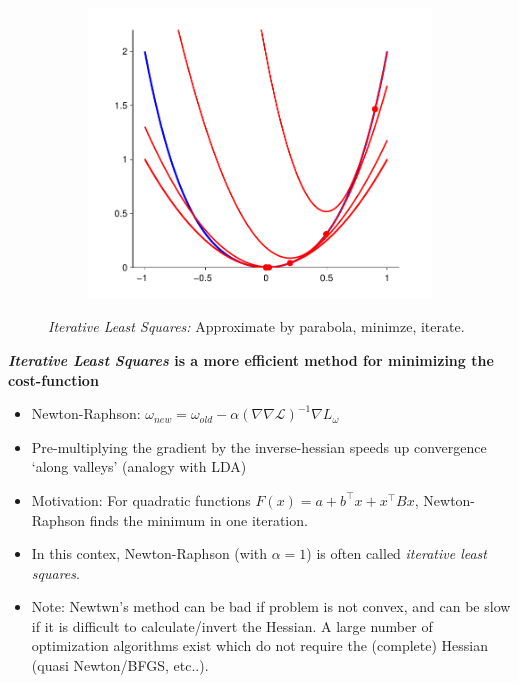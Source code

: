 \begin{figure}
\begin{subfigure}[b]{0.2\textwidth}
		\includegraphics[width=\textwidth]{./lecture7/Newton6}
	\end{subfigure}
	\caption{\emph{Iterative Least Squares:} Approximate by parabola, minimze, iterate.}
\end{figure}



\textbf{\emph{Iterative Least Squares} is a more efficient method for minimizing the cost-function}
\begin{itemize}
\item Newton-Raphson: $\omega_{new}=\omega_{old}-\alpha (\nabla \nabla \mathcal{L})^{-1}\nabla L_\omega$ 
\item Pre-multiplying the gradient by the inverse-hessian speeds up convergence `along valleys' (analogy with LDA)
 \item Motivation: For quadratic functions $F(x)=a+b^\top x+ x^\top B x$, Newton-Raphson finds the minimum in one iteration.
 \item In this contex, Newton-Raphson (with $\alpha=1$) is often called \emph{iterative least squares}.
 \item Note: Newtwn's method can be bad if problem is not convex, and can be slow if it is difficult to calculate/invert the Hessian. A large number of optimization algorithms exist which do not require the (complete) Hessian (quasi Newton/BFGS, etc..). 
\end{itemize}


